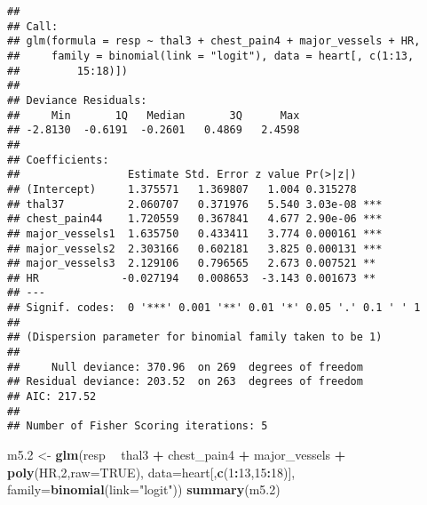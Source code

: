 \documentclass[]{article}
\newenvironment{Shaded}{\begin{snugshade}}{\end{snugshade}}
\newcommand{\KeywordTok}[1]{\textcolor[rgb]{0.13,0.29,0.53}{\textbf{#1}}}
\newcommand{\DataTypeTok}[1]{\textcolor[rgb]{0.13,0.29,0.53}{#1}}
\newcommand{\DecValTok}[1]{\textcolor[rgb]{0.00,0.00,0.81}{#1}}
\newcommand{\StringTok}[1]{\textcolor[rgb]{0.31,0.60,0.02}{#1}}
\newcommand{\OtherTok}[1]{\textcolor[rgb]{0.56,0.35,0.01}{#1}}
\newcommand{\OperatorTok}[1]{\textcolor[rgb]{0.81,0.36,0.00}{\textbf{#1}}}
\newcommand{\NormalTok}[1]{#1}
\begin{document}
\begin{verbatim}
## 
## Call:
## glm(formula = resp ~ thal3 + chest_pain4 + major_vessels + HR, 
##     family = binomial(link = "logit"), data = heart[, c(1:13, 
##         15:18)])
## 
## Deviance Residuals: 
##     Min       1Q   Median       3Q      Max  
## -2.8130  -0.6191  -0.2601   0.4869   2.4598  
## 
## Coefficients:
##                 Estimate Std. Error z value Pr(>|z|)    
## (Intercept)     1.375571   1.369807   1.004 0.315278    
## thal37          2.060707   0.371976   5.540 3.03e-08 ***
## chest_pain44    1.720559   0.367841   4.677 2.90e-06 ***
## major_vessels1  1.635750   0.433411   3.774 0.000161 ***
## major_vessels2  2.303166   0.602181   3.825 0.000131 ***
## major_vessels3  2.129106   0.796565   2.673 0.007521 ** 
## HR             -0.027194   0.008653  -3.143 0.001673 ** 
## ---
## Signif. codes:  0 '***' 0.001 '**' 0.01 '*' 0.05 '.' 0.1 ' ' 1
## 
## (Dispersion parameter for binomial family taken to be 1)
## 
##     Null deviance: 370.96  on 269  degrees of freedom
## Residual deviance: 203.52  on 263  degrees of freedom
## AIC: 217.52
## 
## Number of Fisher Scoring iterations: 5
\end{verbatim}

\begin{Shaded}
\begin{Highlighting}[]
\NormalTok{m5.}\DecValTok{2}\NormalTok{ <-}\StringTok{ }\KeywordTok{glm}\NormalTok{(resp }\OperatorTok{~}\StringTok{ }\NormalTok{thal3 }\OperatorTok{+}\StringTok{ }\NormalTok{chest_pain4 }\OperatorTok{+}\StringTok{ }\NormalTok{major_vessels }\OperatorTok{+}\StringTok{ }\KeywordTok{poly}\NormalTok{(HR,}\DecValTok{2}\NormalTok{,}\DataTypeTok{raw=}\OtherTok{TRUE}\NormalTok{), }\DataTypeTok{data=}\NormalTok{heart[,}\KeywordTok{c}\NormalTok{(}\DecValTok{1}\OperatorTok{:}\DecValTok{13}\NormalTok{,}\DecValTok{15}\OperatorTok{:}\DecValTok{18}\NormalTok{)], }\DataTypeTok{family=}\KeywordTok{binomial}\NormalTok{(}\DataTypeTok{link=}\StringTok{"logit"}\NormalTok{)) }
\KeywordTok{summary}\NormalTok{(m5.}\DecValTok{2}\NormalTok{)}
\end{Highlighting}
\end{Shaded}
\end{document}
